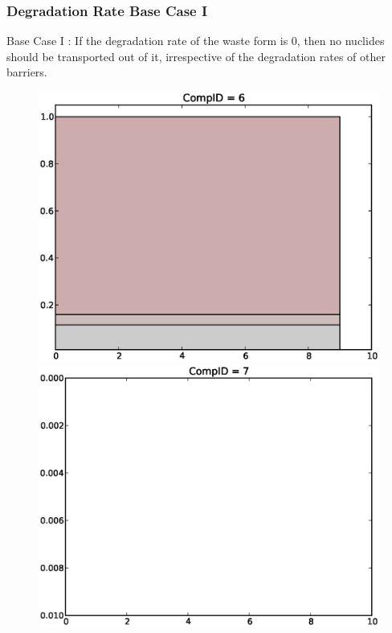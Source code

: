 \begin{frame}
  \frametitle{Degradation Rate Base Case I}
  Base Case I : If the degradation rate of the waste form is 0, then no nuclides should be 
  transported out of it, irrespective of the degradation rates of other 
  barriers. 

  \begin{figure}[htbp!]
    \begin{center}
      \includegraphics[width=.5\textwidth]{cyder/images/0deg_comp6.eps}
      \includegraphics[width=.5\textwidth]{cyder/images/0deg_comp7.eps}
    \end{center}
  \end{figure}
\end{frame}

